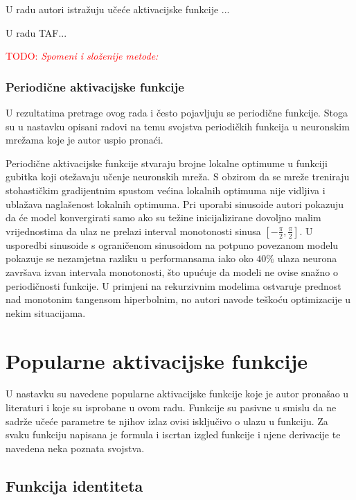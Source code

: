 \documentclass[times, utf8, numeric, diplomski]{fer}
\def\TODO#1{\noindent\textcolor{red}{TODO: \textit{#1}}\newline}
\def\todo#1{\TODO{#1}}
\begin{document}
U radu \citet{trained_func} autori istražuju učeće aktivacijske funkcije ...

U radu TAF...

\todo{Spomeni i složenije metode: \citep{network_in_network}}
\fi %

\subsubsection{Periodične aktivacijske funkcije}
U rezultatima pretrage ovog rada i \citet{swish} često pojavljuju se periodične funkcije. Stoga su u nastavku opisani radovi na temu svojstva periodičkih funkcija u neuronskim mrežama koje je autor uspio pronaći.


Periodične aktivacijske funkcije stvaraju brojne lokalne optimume u funkciji gubitka koji otežavaju učenje neuronskih mreža. S obzirom da se mreže treniraju stohastičkim gradijentnim spustom većina lokalnih optimuma nije vidljiva i ublažava naglašenost lokalnih optimuma. Pri uporabi sinusoide autori pokazuju da će model konvergirati samo ako su težine inicijalizirane dovoljno malim vrijednostima da ulaz ne prelazi interval monotonosti sinusa $[-\frac{\pi}{2}, \frac{\pi}{2}]$. U usporedbi sinusoide s ograničenom sinusoidom na potpuno povezanom modelu pokazuje se nezamjetna razliku u performansama iako oko $40\%$ ulaza neurona završava izvan intervala monotonosti, što upućuje da modeli ne ovise snažno o periodičnosti funkcije. U primjeni na rekurzivnim modelima ostvaruje prednost nad monotonim tangensom hiperbolnim, no autori navode teškoću optimizacije u nekim situacijama. \citep{taming_waves}

\section{Popularne aktivacijske funkcije}
U nastavku su navedene popularne aktivacijske funkcije koje je autor pronašao u literaturi i koje su isprobane u ovom radu. Funkcije su pasivne u smislu da ne sadrže učeće parametre te njihov izlaz ovisi isključivo o ulazu  u funkciju. Za svaku funkciju napisana je formula i iscrtan izgled funkcije i njene derivacije te navedena neka poznata svojstva.

\subsection{Funkcija identiteta}
\end{document}

